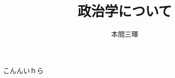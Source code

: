 \documentclass[titlepage,a4paper]{jsarticle}
\title{政治学について}
\author{本間三暉}
\begin{document}
\maketitle
こんんいｈら
\end{document}
